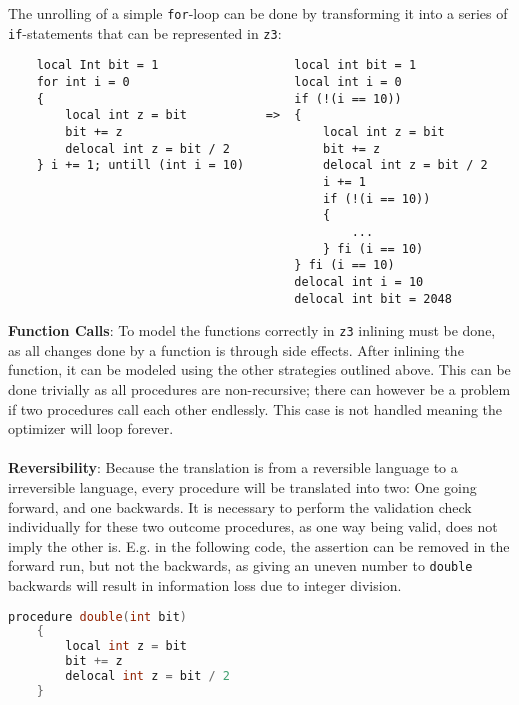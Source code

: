 The unrolling of a simple \texttt{for}-loop can be done by transforming it into a series of
\texttt{if}-statements that can be represented in \texttt{z3}:
\begin{verbatim}
    local Int bit = 1                   local int bit = 1
    for int i = 0                       local int i = 0
    {                                   if (!(i == 10))
        local int z = bit           =>  {
        bit += z                            local int z = bit   
        delocal int z = bit / 2             bit += z
    } i += 1; untill (int i = 10)           delocal int z = bit / 2
                                            i += 1
                                            if (!(i == 10))
                                            {
                                                ...
                                            } fi (i == 10)
                                        } fi (i == 10)
                                        delocal int i = 10
                                        delocal int bit = 2048
\end{verbatim}
\noindent
\textbf{Function Calls}:
To model the functions correctly in \texttt{z3} inlining must be done, as all changes done
by a function is through side effects. After inlining the function, it can be modeled using the
other strategies outlined above. This can be done trivially as all procedures are non-recursive;
there can however be a problem if two procedures call each other endlessly. This case is not handled
meaning the optimizer will loop forever.
\\
\\
\textbf{Reversibility}:
Because the translation is from a reversible language to a irreversible language, every procedure
will be translated into two: One going forward, and one backwards. It is necessary to perform
the validation check individually for these two outcome procedures, as one way being valid, does
not imply the other is. E.g. in the following code, the assertion can be removed in the
forward run, but not the backwards, as giving an uneven number to \texttt{double} backwards will
result in information loss due to integer division.

\begin{lstlisting}[language=C]
    procedure double(int bit)
    {
        local int z = bit
        bit += z
        delocal int z = bit / 2
    }
\end{lstlisting}

